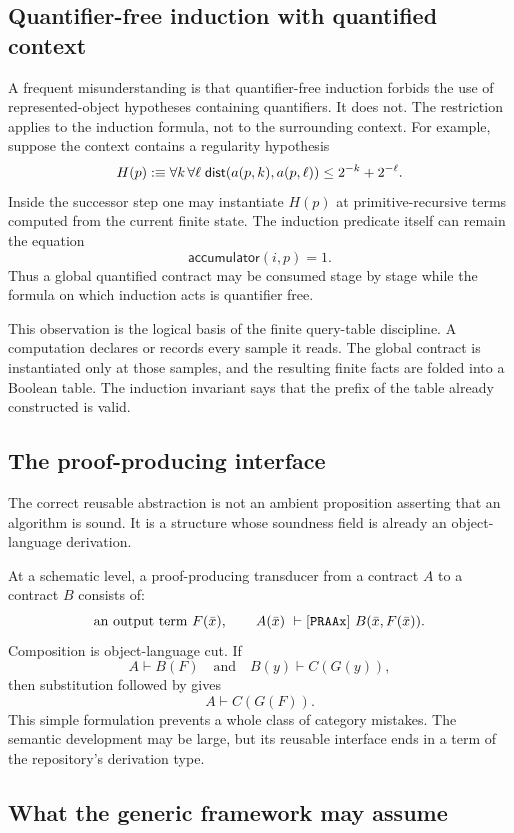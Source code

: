 \subsection{Quantifier-free induction with quantified context}

A frequent misunderstanding is that quantifier-free induction forbids the use
of represented-object hypotheses containing quantifiers.  It does not.  The
restriction applies to the induction formula, not to the surrounding context.
For example, suppose the context contains a regularity hypothesis
\[
  H(p):\equiv \forall k\,\forall \ell\;
    \mathsf{dist}(a(p,k),a(p,\ell))\le 2^{-k}+2^{-\ell}.
\]
Inside the successor step one may instantiate \(H(p)\) at primitive-recursive
terms computed from the current finite state.  The induction predicate itself
can remain the equation
\[
  \mathsf{accumulator}(i,p)=1.
\]
Thus a global quantified contract may be consumed stage by stage while the
formula on which induction acts is quantifier free.

This observation is the logical basis of the finite query-table discipline.
A computation declares or records every sample it reads.  The global contract
is instantiated only at those samples, and the resulting finite facts are
folded into a Boolean table.  The induction invariant says that the prefix of
the table already constructed is valid.

\subsection{The proof-producing interface}

The correct reusable abstraction is not an ambient proposition asserting that
an algorithm is sound.  It is a structure whose soundness field is already an
object-language derivation.

At a schematic level, a proof-producing transducer from a contract \(A\) to a
contract \(B\) consists of:
\[
  \text{an output term }F(\bar x),
  \qquad
  A(\bar x)\ \vdash[\texttt{PRAAx}]\ B(\bar x,F(\bar x)).
\]
Composition is object-language cut.  If
\[
 A\vdash B(F) \quad\text{and}\quad B(y)\vdash C(G(y)),
\]
then substitution followed by  gives
\[
 A\vdash C(G(F)).
\]
This simple formulation prevents a whole class of category mistakes.  The
semantic development may be large, but its reusable interface ends in a term
of the repository's derivation type.

\subsection{What the generic framework may assume}

